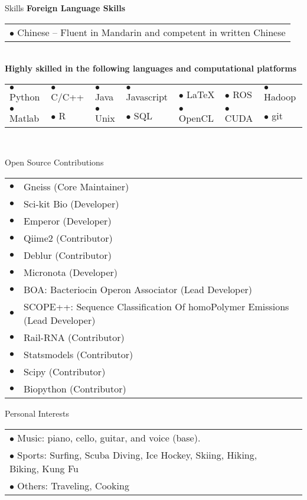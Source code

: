 \documentclass{resume} %
\begin{document}
\begin{rSection}{Skills}
  \textbf{Foreign Language Skills}\\[1 mm]
  \begin{tabular}{l}
    $\bullet$ Chinese --  Fluent in Mandarin and competent in written Chinese\\
  \end{tabular}\\
  \textbf{Highly skilled in the following languages and computational platforms}\\[1 mm]
  \begin{tabular}{lllllll}
     $\bullet$ Python   &  $\bullet$ C/C++ &  $\bullet$ Java  & $\bullet$ Javascript &  $\bullet$ \LaTeX   &  $\bullet$ ROS    &  $\bullet$ Hadoop\\
     $\bullet$ Matlab   &  $\bullet$ R     &  $\bullet$ Unix   & $\bullet$ SQL      &  $\bullet$ OpenCL   &  $\bullet$ CUDA   &   $\bullet$ git\\
  \end{tabular}\\[1 mm]
\end{rSection}
\begin{rSection}{Open Source Contributions}
  \begin{tabular}{ll}
      $\bullet$ & Gneiss (Core Maintainer)\\
      $\bullet$ & Sci-kit Bio (Developer)\\
      $\bullet$ & Emperor (Developer)\\
      $\bullet$ & Qiime2 (Contributor)\\
      $\bullet$ & Deblur (Contributor)\\
      $\bullet$ & Micronota (Developer)\\
      $\bullet$ & BOA: Bacteriocin Operon Associator (Lead Developer)\\
      $\bullet$ & SCOPE++: Sequence Classification Of homoPolymer Emissions (Lead Developer)\\
      $\bullet$ & Rail-RNA (Contributor)\\
      $\bullet$ & Statsmodels (Contributor)\\
      $\bullet$ & Scipy (Contributor)\\
      $\bullet$ & Biopython (Contributor)\\
  \end{tabular}
\end{rSection}

\begin{rSection}{Personal Interests}
  \begin{tabular}{ll}
      $\bullet$ Music: piano, cello, guitar, and voice (base).\\
      $\bullet$ Sports: Surfing, Scuba Diving, Ice Hockey, Skiing, Hiking, Biking, Kung Fu \\
      $\bullet$ Others: Traveling, Cooking\\
  \end{tabular}
\end{rSection}

\end{document}
